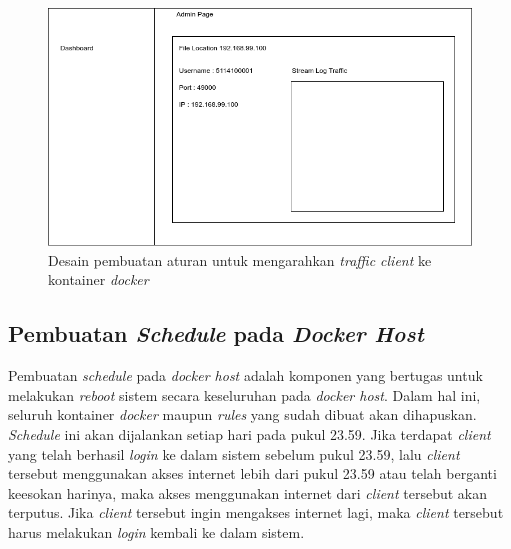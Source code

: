 \begin{figure}[H]
	\centering
	\includegraphics[width=\linewidth]{images/bab3/desainstream}
	\caption{Desain pembuatan aturan untuk mengarahkan \textit{traffic client} ke kontainer \textit{docker}}
	\label{desainstream}
\end{figure}

\subsection{Pembuatan \textit{Schedule} pada \textit{Docker Host}}
Pembuatan \textit{schedule} pada \textit{docker host} adalah komponen yang bertugas untuk melakukan \textit{reboot} sistem secara keseluruhan pada \textit{docker host}. Dalam hal ini, seluruh kontainer \textit{docker} maupun \textit{rules} yang sudah dibuat akan dihapuskan. \textit{Schedule} ini akan dijalankan setiap hari pada pukul 23.59. Jika terdapat \textit{client} yang telah berhasil \textit{login} ke dalam sistem sebelum pukul 23.59, lalu \textit{client} tersebut menggunakan akses internet lebih dari pukul 23.59 atau telah berganti keesokan harinya, maka akses menggunakan internet dari \textit{client} tersebut akan terputus. Jika \textit{client} tersebut ingin mengakses internet lagi, maka \textit{client} tersebut harus melakukan \textit{login} kembali ke dalam sistem.